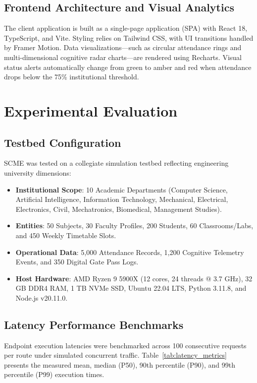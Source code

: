 \documentclass[conference]{IEEEtran}
\begin{document}
\subsection{Frontend Architecture and Visual Analytics}
The client application is built as a single-page application (SPA) with React 18, TypeScript, and Vite. Styling relies on Tailwind CSS, with UI transitions handled by Framer Motion. Data visualizations---such as circular attendance rings and multi-dimensional cognitive radar charts---are rendered using Recharts. Visual status alerts automatically change from green to amber and red when attendance drops below the 75\% institutional threshold.

\section{Experimental Evaluation}
\label{sec:experiments}

\subsection{Testbed Configuration}
SCME was tested on a collegiate simulation testbed reflecting engineering university dimensions:
\begin{itemize}
    \item \textbf{Institutional Scope}: 10 Academic Departments (Computer Science, Artificial Intelligence, Information Technology, Mechanical, Electrical, Electronics, Civil, Mechatronics, Biomedical, Management Studies).
    \item \textbf{Entities}: 50 Subjects, 30 Faculty Profiles, 200 Students, 60 Classrooms/Labs, and 450 Weekly Timetable Slots.
    \item \textbf{Operational Data}: 5,000 Attendance Records, 1,200 Cognitive Telemetry Events, and 350 Digital Gate Pass Logs.
    \item \textbf{Host Hardware}: AMD Ryzen 9 5900X (12 cores, 24 threads @ 3.7 GHz), 32 GB DDR4 RAM, 1 TB NVMe SSD, Ubuntu 22.04 LTS, Python 3.11.8, and Node.js v20.11.0.
\end{itemize}

\subsection{Latency Performance Benchmarks}
Endpoint execution latencies were benchmarked across 100 consecutive requests per route under simulated concurrent traffic. Table~\ref{tab:latency_metrics} presents the measured mean, median (P50), 90th percentile (P90), and 99th percentile (P99) execution times.
\end{document}
